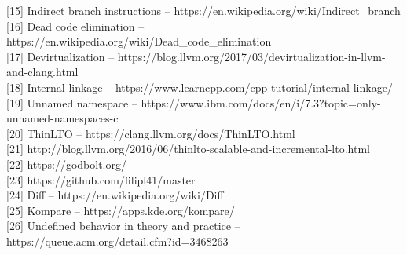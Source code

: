 \documentclass[12pt,oneside]{memoir}
\begin{document}
[15] Indirect branch instructions -- https://en.wikipedia.org/wiki/Indirect{\_}branch \\

[16] Dead code elimination -- https://en.wikipedia.org/wiki/Dead{\_}code{\_}elimination \\

[17] Devirtualization -- https://blog.llvm.org/2017/03/devirtualization-in-llvm-and-clang.html \\

[18] Internal linkage -- https://www.learncpp.com/cpp-tutorial/internal-linkage/ \\

[19] Unnamed namespace -- https://www.ibm.com/docs/en/i/7.3?topic=only-unnamed-namespaces-c \\

[20] ThinLTO -- https://clang.llvm.org/docs/ThinLTO.html \\

[21] http://blog.llvm.org/2016/06/thinlto-scalable-and-incremental-lto.html \\

[22] https://godbolt.org/ \\

[23] https://github.com/filipl41/master \\

[24] Diff -- https://en.wikipedia.org/wiki/Diff \\

[25] Kompare -- https://apps.kde.org/kompare/ \\

[26] Undefined behavior in theory and practice -- https://queue.acm.org/detail.cfm?id=3468263
\end{document}
